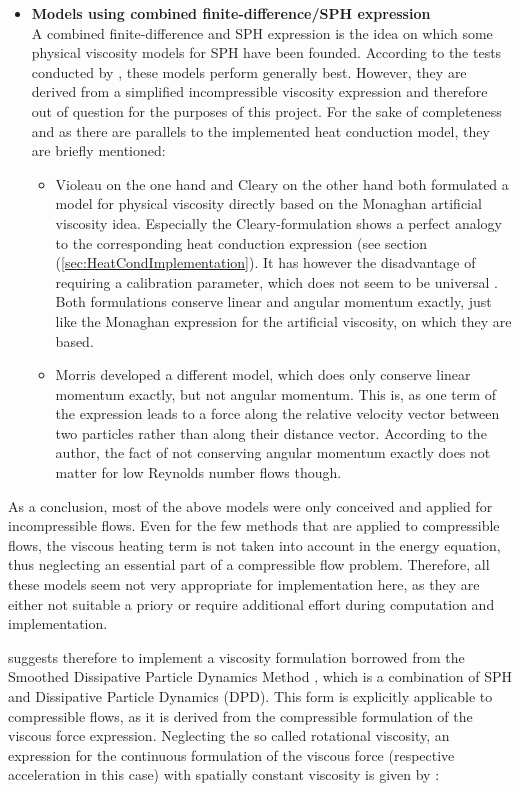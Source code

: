 \documentclass{report}
\begin{document}
\begin{itemize}
\item {\bf Models using combined finite-difference/SPH expression}\\
A combined finite-difference and SPH expression is the idea on which some physical viscosity models for SPH have been founded. According to the tests conducted by \cite{Basa2009}, these models perform generally best. However, they are derived from a simplified incompressible viscosity expression and therefore out of question for the purposes of this project. For the sake of completeness and as there are parallels to the implemented heat conduction model, they are briefly mentioned:
\begin{itemize}
 \item Violeau on the one hand and Cleary on the other hand both formulated a model for physical viscosity directly based on the Monaghan artificial viscosity idea. Especially the Cleary-formulation shows a perfect analogy to the corresponding heat conduction expression (see section (\ref{sec:HeatCondImplementation}).
 It has however the disadvantage of requiring a calibration parameter, which does not seem to be universal \cite{Basa2009}.
Both formulations conserve linear and angular momentum exactly, just like the Monaghan expression for the artificial viscosity, on which they are based.	
\item Morris \cite{Morris1997} developed a different model, which does only conserve linear momentum exactly, but not angular momentum. This is, as one term of the expression leads to a force along the relative velocity vector between two particles rather than along their distance vector. According to the author, the fact of not conserving angular momentum exactly does not matter for low Reynolds number flows though. 

\end{itemize}
\end{itemize}

As a conclusion, most of the above models were only conceived and applied for incompressible flows. Even for the few methods that are applied to compressible flows, the viscous heating term is not taken into account in the energy equation, thus neglecting an essential part of a compressible flow problem.
Therefore, all these models seem not very appropriate for implementation here, as they are either not suitable a priory or require additional effort during computation and implementation.

\cite{LitvinovPersCom} suggests therefore to implement a viscosity formulation borrowed from the Smoothed Dissipative Particle Dynamics Method \cite{Espanol2003}, which is a combination of SPH and Dissipative Particle Dynamics (DPD). This form is explicitly applicable to compressible flows, as it is derived from the compressible formulation of the viscous force expression.
Neglecting the so called rotational viscosity, an expression for the continuous formulation of the viscous force (respective acceleration in this case) with spatially constant viscosity is given by  \cite{deGroot1962}:
\end{document}
